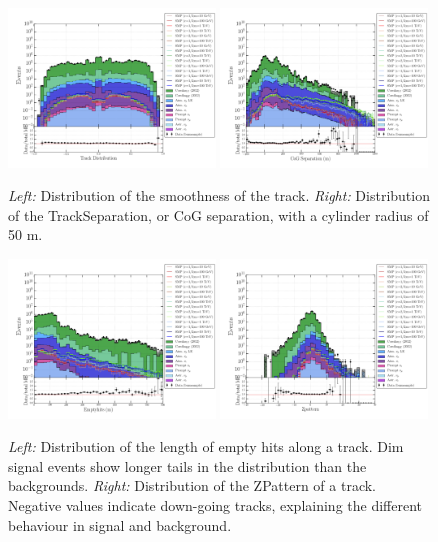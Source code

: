 \begin{figure}
\centering
\includegraphics[width = 0.49\textwidth]{chapter8/img/1D_stack_trackdistribution_50.png}
\includegraphics[width = 0.49\textwidth]{chapter8/img/1D_stack_trackseparation_50.png}
\caption{\textit{Left: }Distribution of the smoothness of the track. \textit{Right: }Distribution of the TrackSeparation, or CoG separation, with a cylinder radius of 50 m.}
\label{fig:commonvariables3}
\end{figure}

\begin{figure}
\centering
\includegraphics[width = 0.49\textwidth]{chapter8/img/1D_stack_emptyhits_100.png}
\includegraphics[width = 0.49\textwidth]{chapter8/img/1D_stack_zpattern.png}
\caption{\textit{Left: }Distribution of the length of empty hits along a track. Dim signal events show longer tails in the distribution than the backgrounds. \textit{Right: }Distribution of the ZPattern of a track. Negative values indicate down-going tracks, explaining the different behaviour in signal and background.}
\label{fig:commonvariables4}
\end{figure}

